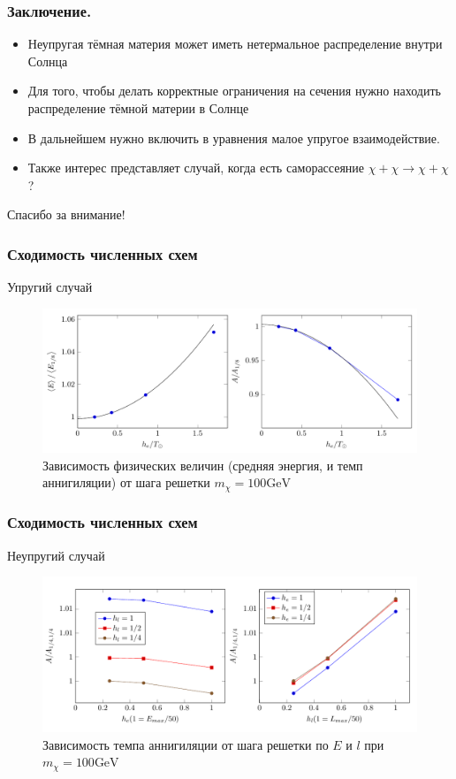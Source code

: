 \documentclass[
11pt,]{beamer}
\begin{document}
	\begin{frame}
		\frametitle{Заключение.}
		\begin{itemize}
	\item Неупругая тёмная материя может иметь нетермальное распределение внутри Солнца
	\item Для того, чтобы делать корректные ограничения на сечения нужно находить распределение тёмной материи в Солнце
	\item В дальнейшем нужно включить в уравнения малое упругое взаимодействие.
	\item Также интерес представляет случай, когда есть саморассеяние $\chi + \chi \rightarrow \chi + \chi$?
	
\end{itemize}
	\end{frame}
	\begin{frame}
		\centering
Спасибо за внимание!
	\end{frame}
	
	\begin{frame}
		\frametitle{Сходимость численных схем}
		Упругий случай
\begin{figure}[!h]
	\centering
	\includegraphics[width=\textwidth]{images/ConvEl.png}
	\caption{Зависимость физических величин (средняя энергия, и темп аннигиляции) от шага решетки $m_{\chi} = 100 \text{GeV}$}
\end{figure}
	\end{frame}
	\begin{frame}
		\frametitle{Сходимость численных схем}
		Неупругий случай
\begin{figure}[!h]
	\centering
	\includegraphics[width=\textwidth]{images/ConvInel.png}
	\caption{Зависимость  темпа аннигиляции от шага решетки по $E$ и $l$ при $m_{\chi} = 100 \text{GeV}$}
\end{figure}
	\end{frame}
\end{document}
